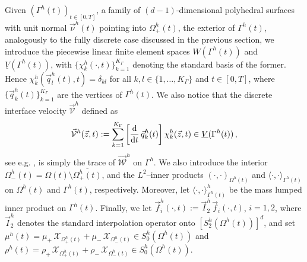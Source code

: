 \documentclass[a4paper,12pt,onecolumn]{article}
\newcommand{\W}{\vec{\mathcal W}}
\newcommand{\bigchi}{\ensuremath{\mathrm{\mathcal{X}}}}
\newcommand{\charfcn}[1]{\bigchi_{#1}} %
\newcommand{\Vht}{\underline{V}(\Gamma^h(t))}
\newcommand{\Wht}{W(\Gamma^h(t))}
\newcommand{\ddt}{\frac{\rm d}{{\rm d}t}}
\newcommand{\V}{\vec{\mathcal{V}}} %
\begin{document}
Given $(\Gamma^h(t))_{t\in[0,T]}$, a family of
$(d-1)$-dimensional polyhedral surfaces with unit normal $\vec\nu^h(t)$
pointing into $\Omega^h_+(t)$, the exterior of $\Gamma^h(t)$,
analogously to the fully discrete case discussed in the previous section, we
introduce the
piecewise linear finite element spaces $\Wht$ and $\Vht$, with
$\{\chi^h_k(\cdot,t)\}_{k=1}^{K_\Gamma}$ denoting the standard basis of the
former. Hence $\chi^h_k(\vec q^h_l(t),t) = \delta_{kl}$ for all
$k,l \in \{1,\ldots,K_\Gamma\}$ and $t \in [0,T]$, where
$\{\vec q^h_k(t)\}_{k=1}^{K_\Gamma}$ are the vertices of $\Gamma^h(t)$. We also
notice that the discrete interface velocity $\V^h$ defined as
\begin{equation}\label{eq:Vsemidisc}
\V^h(\vec z, t):=
\sum_{k=1}^{K_\Gamma}\left[\ddt\,\vec q^h_k(t)\right] \chi^h_k(\vec z, t)
\in \Vht\,,
\end{equation}
see e.g. \cite[(3.3)]{tpfs}, is simply the trace of $\W^h$ on $\Gamma^h$.
We also introduce the interior $\Omega^h_-(t) = \Omega(t) \setminus
\overline{\Omega^h_+(t)}$, and the $L^2$--inner products
$(\cdot,\cdot)_{\Omega^h(t)}$ and $\langle\cdot,\cdot\rangle_{\Gamma^h(t)}$
on $\Omega^h(t)$ and $\Gamma^h(t)$, respectively. Moreover, let
$\langle\cdot,\cdot\rangle_{\Gamma^h(t)}^h$ be the mass lumped inner product on
$\Gamma^h(t)$.
Finally, we let $\vec f_i^h(\cdot,t) := \vec I^h_2\,\vec f_i(\cdot,t)$,
$i=1,2$, where $\vec I^h_2$ denotes the standard interpolation operator onto
$[S^h_2(\Omega^h(t))]^d$, and set
$\mu^h(t) = \mu_+\,\charfcn{\Omega^h_+(t)} + \mu_-\,\charfcn{\Omega^h_-(t)}\in
S^h_0(\Omega^h(t))$
and
$\rho^h(t)
= \rho_+\,\charfcn{\Omega^h_+(t)} + \rho_-\,\charfcn{\Omega^h_-(t)}\in
S^h_0(\Omega^h(t))$.
\end{document}
